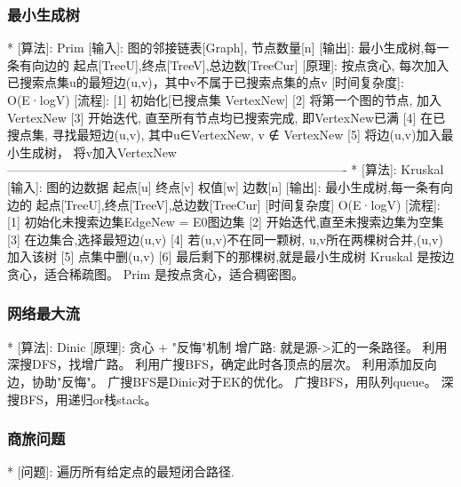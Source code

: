 \documentclass{article}
\begin{document}
        \subsubsection{最小生成树}
        *	[算法]: Prim
                [输入]: 图的邻接链表[Graph], 节点数量[n]
                [输出]: 最小生成树,每一条有向边的 起点[TreeU],终点[TreeV],总边数[TreeCur]
                [原理]: 按点贪心, 每次加入已搜索点集u的最短边(u,v)，其中v不属于已搜索点集的点v
                [时间复杂度]: O(E·logV)
                [流程]:
                    [1] 初始化[已搜点集 VertexNew]
                    [2] 将第一个图的节点, 加入VertexNew
                    [3] 开始迭代, 直至所有节点均已搜索完成, 即VertexNew已满
                        [4] 在已搜点集, 寻找最短边(u,v), 其中u∈VertexNew, v ∉ VertexNew
                        [5] 将边(u,v)加入最小生成树， 将v加入VertexNew
        ----------------------------------------------------------------------------------
        *	[算法]: Kruskal
                [输入]: 图的边数据 起点[u] 终点[v] 权值[w] 边数[n]
                [输出]: 最小生成树,每一条有向边的 起点[TreeU],终点[TreeV],总边数[TreeCur]
                [时间复杂度] O(E·logV)
                [流程]:
                    [1] 初始化未搜索边集EdgeNew = E0图边集
                    [2] 开始迭代,直至未搜索边集为空集
                        [3] 在边集合,选择最短边(u,v)
                        [4] 若(u,v)不在同一颗树, u,v所在两棵树合并,(u,v)加入该树
                        [5] 点集中删(u,v)
                    [6] 最后剩下的那棵树,就是最小生成树
                Kruskal	是按边贪心，适合稀疏图。
                Prim	是按点贪心，适合稠密图。

        \subsubsection{网络最大流}
        *	[算法]: Dinic
                [原理]: 贪心 + "反悔"机制
                增广路: 就是源->汇的一条路径。
                    利用深搜DFS，找增广路。
                    利用广搜BFS，确定此时各顶点的层次。
                    利用添加反向边，协助"反悔"。
                    广搜BFS是Dinic对于EK的优化。
                    广搜BFS，用队列queue。
                    深搜BFS，用递归or栈stack。

        \subsubsection{商旅问题}
        *	[问题]: 遍历所有给定点的最短闭合路径.
\end{document}
